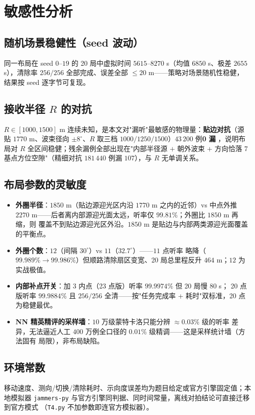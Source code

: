 \section{敏感性分析}

\subsection{随机场景稳健性（seed 波动）}

同一布局在 seed $0$--$19$ 的 20 局中虚拟时间 $5615$--$8270$ s（均值 $6850$ s、极差
$2655$ s），清除率 $256/256$ 全部完成、误差全部 $\le 20$ m——策略对场景随机性稳健，
结果按 seed 逐字节可复现。

\subsection{接收半径 $R$ 的对抗}

$R\in[1000,1500]$ m 连续未知，是本文对"漏听"最敏感的物理量：\textbf{贴边对抗}（源贴
$1770$ m、波束径向 $\pm 8^\circ$、$R$ 取三档 $1000/1250/1500$）$43\,200$ 例\textbf{0 漏}
，说明布局对 $R$ 全区间稳健；残余漏例全部出现在"内部半径源 $+$ 朝外波束 $+$ 方向恰落
7 基点方位空隙"（精细对抗 $181\,440$ 例漏 $107$），与 $R$ 无单调关系。

\subsection{布局参数的灵敏度}

\begin{itemize}
  \item \textbf{外圈半径}：$1850$ m（贴边源迎光区内沿 $1770$ m 之内的近邻）vs 中点外推
        $2270$ m——后者离内部源迎光面太远，听率仅 $99.81\%$；外圈比 $1850$ m 再缩，则
        覆盖不到贴边源迎光区外沿。$1850$ m 是贴边与内部两类源迎光面覆盖的平衡点。
  \item \textbf{外圈个数}：$12$（间隔 $30^\circ$）vs $11$（$32.7^\circ$）——$11$ 点听率
        略降（$99.989\% \to 99.986\%$）但顺路清除扇区变宽、20 局总里程反升 $464$ m；$12$
        为实战极值。
  \item \textbf{内部补点开关}：加 $3$ 内点（23 点版）听率 $99.9974\%$ 但 20 局慢 $80$ s；
        20 点版听率 $99.9884\%$ 且 $256/256$ 全清——按"任务完成率 + 耗时"双标准，20 点
        为稳健最优。
  \item \textbf{NN 精英精评的采样墙}：$10$ 万级蒙特卡洛只能分辨 $\approx 0.03\%$ 级的听率
        差异，无法逼近人工 $400$ 万例全口径的 $0.01\%$ 级精调——这是采样统计墙（方法固有
        局限），非布局缺陷。
\end{itemize}

\subsection{环境常数}

移动速度、测向/切换/清除耗时、示向度误差均为题目给定或官方引擎固定值；本地模拟器
\texttt{jammers-py} 与官方引擎同判据、同时间常量，离线对拍结论可直接迁移到官方模式
（\texttt{T4.py} 不加参数即连官方模拟器）。